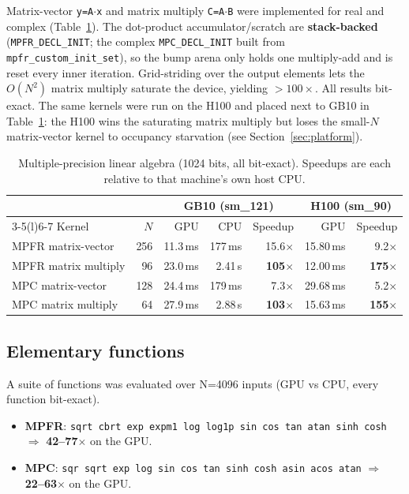 \documentclass[uplatex,dvipdfmx,a4paper,11pt]{jsarticle}
\newcommand{\code}[1]{\texttt{#1}}
\begin{document}
Matrix-vector \code{y=A\(\cdot\)x} and matrix multiply \code{C=A\(\cdot\)B} were
implemented for real and complex (Table~\ref{tab:linalg}). The dot-product
accumulator/scratch are \textbf{stack-backed} (\code{MPFR\_DECL\_INIT}; the complex
\code{MPC\_DECL\_INIT} built from \code{mpfr\_custom\_init\_set}), so the bump arena
only holds one multiply-add and is reset every inner iteration. Grid-striding over
the output elements lets the $O(N^2)$ matrix multiply saturate the device,
yielding $>100\times$. All results bit-exact. The same kernels were run on the H100
and placed next to GB10 in Table~\ref{tab:linalg}: the H100 wins the saturating
matrix multiply but loses the small-$N$ matrix-vector kernel to occupancy
starvation (see Section~\ref{sec:platform}).

\begin{table}[h]
\centering
\caption{Multiple-precision linear algebra (1024 bits, all bit-exact). Speedups are
each relative to that machine's own host CPU.}
\label{tab:linalg}
\begin{tabular}{lrrrr@{\hskip 2em}rr}
\toprule
 & & \multicolumn{3}{c}{GB10 (sm\_121)} & \multicolumn{2}{c}{H100 (sm\_90)}\\
\cmidrule(r){3-5}\cmidrule(l){6-7}
Kernel & $N$ & GPU & CPU & Speedup & GPU & Speedup \\
\midrule
MPFR  matrix-vector   & 256 & 11.3\,ms & 177\,ms  & 15.6$\times$          & 15.80\,ms & 9.2$\times$ \\
MPFR  matrix multiply & 96  & 23.0\,ms & 2.41\,s  & \textbf{105$\times$} & 12.00\,ms & \textbf{175$\times$} \\
MPC   matrix-vector   & 128 & 24.4\,ms & 179\,ms  & 7.3$\times$          & 29.68\,ms & 5.2$\times$ \\
MPC   matrix multiply & 64  & 27.9\,ms & 2.88\,s  & \textbf{103$\times$} & 15.63\,ms & \textbf{155$\times$} \\
\bottomrule
\end{tabular}
\end{table}

\subsection{Elementary functions}

A suite of functions was evaluated over N=4096 inputs (GPU vs CPU, every function
bit-exact).
\begin{itemize}
\item \textbf{MPFR}: \code{sqrt cbrt exp expm1 log log1p sin cos tan atan sinh cosh}
      $\Rightarrow$ \textbf{42--77$\times$} on the GPU.
\item \textbf{MPC}: \code{sqr sqrt exp log sin cos tan sinh cosh asin acos atan}
      $\Rightarrow$ \textbf{22--63$\times$} on the GPU.
\end{itemize}
\end{document}
